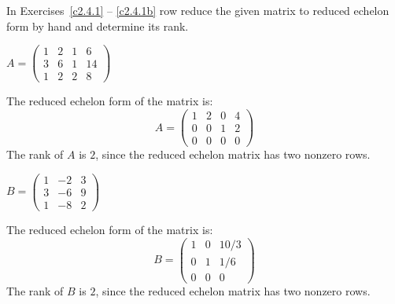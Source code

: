 \documentclass{ximera}
\begin{document}
\noindent In Exercises~\ref{c2.4.1} -- \ref{c2.4.1b} row reduce the given 
matrix to reduced echelon form by hand and determine its rank.
\begin{exercise} \label{c2.4.1}
$A=\left(\begin{array}{rrrr}
1 &  2 & 1 & 6\\
3 &  6 & 1 & 14\\
1 &  2 & 2 & 8
         \end{array}\right)$
  
  \begin{solution}
  \soln
The reduced echelon form of the matrix is:
\[
A = \left(\begin{array}{rrrr} 1 & 2 & 0 & 4 \\ 0 & 0 & 1 & 2 \\ 0 & 0 & 0
& 0\end{array}\right)
\]
The rank of $A$ is $2$, since the reduced echelon matrix has two nonzero rows.

\end{solution}
\end{exercise}

\begin{exercise} \label{c2.4.1b}
$B=\left(\begin{array}{rrr}
1 &  -2 & 3\\
3 &  -6 & 9 \\
1 &  -8 & 2
         \end{array}\right)$
  
\begin{solution}
\soln
The reduced echelon form of the matrix is:
\[
B=\left(\begin{array}{rrc} 1 & 0 & 10/3 \\ 
0 & 1 & 1/6 \\ 0 & 0 & 0 \end{array}\right)
\]
The rank of $B$ is $2$, since the reduced echelon matrix has two nonzero
rows.

\end{solution}
\end{exercise}
\end{document}
